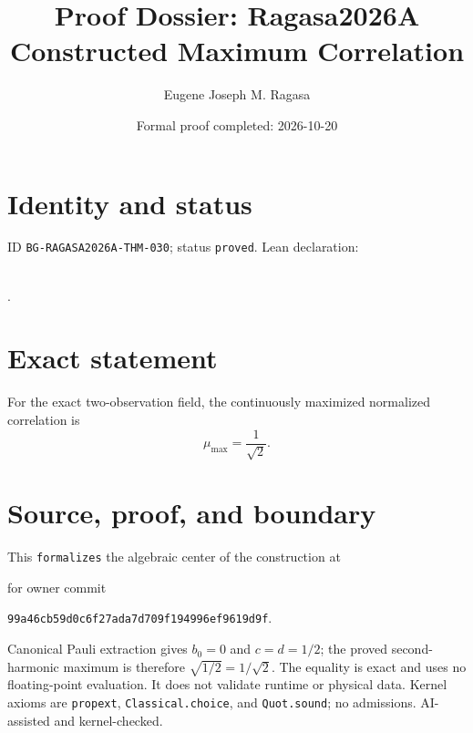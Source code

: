 \documentclass[11pt]{article}
\title{Proof Dossier: Ragasa2026A Constructed Maximum Correlation}\author{Eugene Joseph M. Ragasa}\date{Formal proof completed: 2026-10-20}
\begin{document}
\maketitle
\section{Identity and status}
ID \texttt{BG-RAGASA2026A-THM-030}; status \texttt{proved}. Lean declaration:
\par{}\\
{\tiny{}}.
\section{Exact statement}
For the exact two-observation field, the continuously maximized normalized correlation is
\[
 \mu_{\max}=\frac{1}{\sqrt{2}}.
\]
\section{Source, proof, and boundary}
This \texttt{formalizes} the algebraic center of the construction at
\begin{center}\small{}\end{center}
for owner commit
\begin{center}\small\texttt{99a46cb59d0c6f27ada7d709f194996ef9619d9f}.\end{center}
Canonical Pauli extraction gives
$b_0=0$ and $c=d=1/2$; the proved second-harmonic maximum is therefore
$\sqrt{1/2}=1/\sqrt{2}$. The equality is exact and uses no floating-point evaluation.
It does not validate runtime or physical data. Kernel axioms are \texttt{propext},
\texttt{Classical.choice}, and \texttt{Quot.sound}; no admissions. AI-assisted and
kernel-checked.
\end{document}

